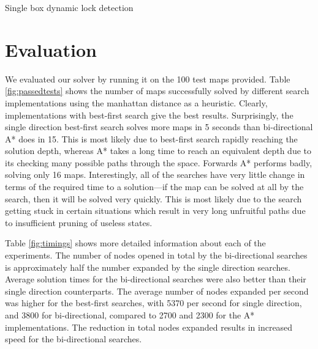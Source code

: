 \documentclass[a4paper,11pt]{article}
\begin{document}
\begin{algorithm}
  \DontPrintSemicolon
  
  
\caption{Single box dynamic lock detection}
\label{alg:dynamiclocks}
\end{algorithm}

\section{Evaluation}
We evaluated our solver by running it on the 100 test maps provided. Table
\ref{fig:passedtests} shows the number of maps successfully solved by different
search implementations using the manhattan distance as a heuristic. Clearly,
implementations with best-first search give the best results. Surprisingly, the
single direction best-first search solves more maps in 5 seconds than
bi-directional A* does in 15. This is most likely due to best-first search
rapidly reaching the solution depth, whereas A* takes a long time to reach an
equivalent depth due to its checking many possible paths through the
space. Forwards A* performs badly, solving only 16 maps. Interestingly, all of
the searches have very little change in terms of the required time to a
solution---if the map can be solved at all by the search, then it will be solved
very quickly. This is most likely due to the search getting stuck in certain
situations which result in very long unfruitful paths due to insufficient
pruning of useless states.

Table \ref{fig:timings} shows more detailed information about each of the
experiments. The number of nodes opened in total by the bi-directional searches
is approximately half the number expanded by the single direction
searches. Average solution times for the bi-directional searches were also
better than their single direction counterparts. The average number of nodes
expanded per second was higher for the best-first searches, with 5370 per second
for single direction, and 3800 for bi-directional, compared to 2700 and 2300 for
the A* implementations. The reduction in total nodes expanded results in
increased speed for the bi-directional searches.
\end{document}
